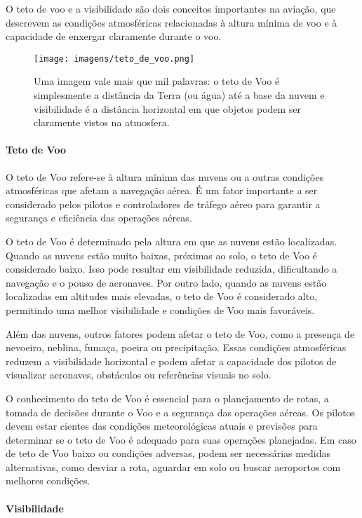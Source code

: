 \documentclass[a4paper, 12pt, onecolumn,singlespacing]{article}
\begin{document}
	O teto de voo e a visibilidade são dois conceitos importantes na aviação, que descrevem as condições atmosféricas relacionadas à altura mínima de voo e à capacidade de enxergar claramente durante o voo.
	
	\begin{figure}[h]
		\centering
		\texttt{[image: imagens/teto\_de\_voo.png]}
		\caption{Uma imagem vale mais que mil palavras: o teto de Voo é simplesmente a distância da Terra (ou água) até a base da nuvem e visibilidade é a distância horizontal em que objetos podem ser claramente vistos na atmosfera.}
		\label{fig:teto_de_voo}
	\end{figure}
	
	\paragraph{Teto de Voo} O teto de Voo refere-se à altura mínima das nuvens ou a outras condições atmosféricas que afetam a navegação aérea. É um fator importante a ser considerado pelos pilotos e controladores de tráfego aéreo para garantir a segurança e eficiência das operações aéreas.
	
	O teto de Voo é determinado pela altura em que as nuvens estão localizadas. Quando as nuvens estão muito baixas, próximas ao solo, o teto de Voo é considerado baixo. Isso pode resultar em visibilidade reduzida, dificultando a navegação e o pouso de aeronaves. Por outro lado, quando as nuvens estão localizadas em altitudes mais elevadas, o teto de Voo é considerado alto, permitindo uma melhor visibilidade e condições de Voo mais favoráveis.
	
	Além das nuvens, outros fatores podem afetar o teto de Voo, como a presença de nevoeiro, neblina, fumaça, poeira ou precipitação. Essas condições atmosféricas reduzem a visibilidade horizontal e podem afetar a capacidade dos pilotos de visualizar aeronaves, obstáculos ou referências visuais no solo.
	
	O conhecimento do teto de Voo é essencial para o planejamento de rotas, a tomada de decisões durante o Voo e a segurança das operações aéreas. Os pilotos devem estar cientes das condições meteorológicas atuais e previsões para determinar se o teto de Voo é adequado para suas operações planejadas. Em caso de teto de Voo baixo ou condições adversas, podem ser necessárias medidas alternativas, como desviar a rota, aguardar em solo ou buscar aeroportos com melhores condições.
	
	\paragraph{Visibilidade}
	
\end{document}
